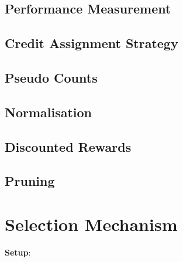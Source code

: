 \subsection{Performance Measurement}
\label{sec:bhh:performance_log:performance_measurement}

\subsection{Credit Assignment Strategy}
\label{sec:bhh:performance_log:credit_assignment_strategy}

\subsection{Pseudo Counts}
\label{sec:bhh:performance_log:pseudo_counts}

\subsection{Normalisation}
\label{sec:bhh:credit_assignment_strategy:normalisation}

\subsection{Discounted Rewards}
\label{sec:bhh:credit_assignment_strategy:discounted_rewards}

\subsection{Pruning}
\label{sec:bhh:performance_log:pruning}

\section{Selection Mechanism}
\label{sec:bhh:selection_mechanism}

\textbf{Setup}:

